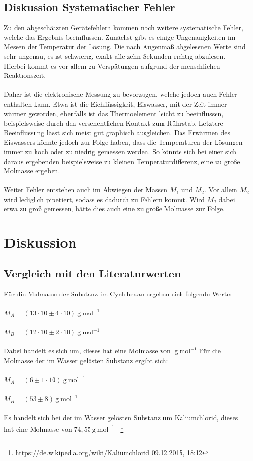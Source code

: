 \documentclass[12pt,a4paper,titlepage,headinclude,bibtotoc]{scrartcl}
\begin{document}
\subsection{Diskussion Systematischer Fehler}
Zu den abgeschätzten Gerätefehlern kommen noch weitere systematische Fehler, welche das Ergebnis beeinflussen. Zunächst gibt es einige Ungenauigkeiten im Messen der Temperatur der Lösung. Die nach Augenmaß abgelesenen Werte sind sehr ungenau, es ist schwierig, exakt alle zehn Sekunden richtig abzulesen. Hierbei kommt es vor allem zu Verspätungen aufgrund der menschlichen Reaktionszeit.\\\\ Daher ist die elektronische Messung zu bevorzugen, welche jedoch auch Fehler enthalten kann. Etwa ist die Eichflüssigkeit, Eiswasser, mit der Zeit immer wärmer geworden, ebenfalls ist das Thermoelement leicht zu beeinflussen, beispielsweise durch den versehentlichen Kontakt zum Rührstab. Letztere Beeinflussung lässt sich meist gut graphisch ausgleichen. Das Erwärmen des Eiswassers könnte jedoch zur Folge haben, dass die Temperaturen der Lösungen immer zu hoch oder zu niedrig gemessen werden. So könnte sich bei einer sich daraus ergebenden beispielsweise zu kleinen Temperaturdifferenz, eine zu große Molmasse ergeben.\\\\
Weiter Fehler entstehen auch im Abwiegen der Massen $M_1$ und $M_2$. Vor allem $M_2$ wird lediglich pipetiert, sodass es dadurch zu Fehlern kommt. Wird $M_2$ dabei etwa zu groß gemessen, hätte dies auch eine zu große Molmasse zur Folge.

\section{Diskussion}
\subsection{Vergleich mit den Literaturwerten}
Für die Molmasse der Substanz im Cyclohexan ergeben sich folgende Werte:\\\\
$M_A = (13 \cdot 10 \pm 4 \cdot 10){~} \mathrm{g{~}mol^{-1}}$\\\\
$M_B = (12 \cdot 10 \pm 2 \cdot 10){~} \mathrm{g{~}mol^{-1}}$\\\\
Dabei handelt es sich um, dieses hat eine Molmasse von ${~} \mathrm{g{~}mol^{-1}}$
Für die Molmasse der im Wasser gelösten Substanz ergibt sich:\\\\
$M_A = (6  \pm 1 \cdot 10){~} \mathrm{g{~}mol^{-1}}$\\\\
$M_B = (53 \pm 8 ){~} \mathrm{g{~}mol^{-1}}$\\\\
Es handelt sich bei der im Wasser gelösten Substanz um Kaliumchlorid, dieses hat eine Molmasse von $74,55{~} \mathrm{g{~}mol^{-1}}$ {~}\footnote{https://de.wikipedia.org/wiki/Kaliumchlorid 09.12.2015, 18:12}
\end{document}
